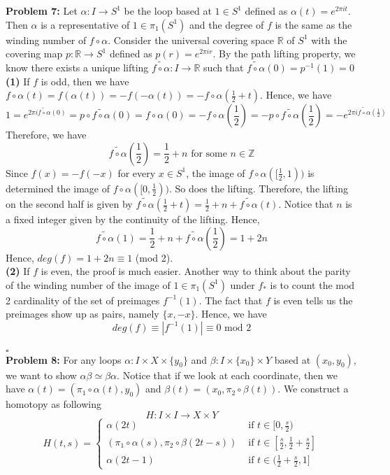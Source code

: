 \documentclass[12pt]{amsart}
\newcommand{\R}{\mathbb{R}}
\newcommand{\Z}{\mathbb{Z}}
\begin{document}
\textbf{Problem 7:} Let $\alpha: I \rightarrow S^1$ be the loop based at $1\in S^1$ defined as $\alpha(t)=e^{2\pi i t}$. Then $\alpha$ is a representative of $1\in \pi_1(S^1)$ and the degree of $f$ is the same as the winding number of $f\circ \alpha$. Consider the universal covering space $\R$ of $S^1$ with the covering map $p:\R\rightarrow S^1$ defined as $p(r)=e^{2\pi i r}$. By the path lifting property, we know there exists a unique lifting $\widetilde{f\circ \alpha}: I\rightarrow \R$ such that $\widetilde{f\circ \alpha}(0)=p^{-1}(1)=0$\\
\textbf{(1)} If $f$ is odd, then we have $f\circ \alpha(t)=f(\alpha(t))=-f(-\alpha(t))=-f\circ \alpha(\frac{1}{2}+t)$. Hence, we have
\[1=e^{2\pi i\widetilde{f\circ \alpha}(0)}=p\circ \widetilde{f\circ \alpha}(0)=f\circ \alpha(0)=-f\circ\alpha(\frac{1}{2})=-p\circ \widetilde{f\circ \alpha}(\frac{1}{2})=-e^{2\pi i\widetilde{f\circ \alpha}(\frac{1}{2})}\]
Therefore, we have
\[\widetilde{f\circ \alpha}(\frac{1}{2})=\frac{1}{2}+n \text{ for some }n\in \Z\]
Since $f(x)=-f(-x)$ for every $x\in S^1$, the image of $f\circ \alpha([\frac{1}{2},1))$ is determined the image of $f\circ \alpha([0,\frac{1}{2}))$. So does the lifting. Therefore, the lifting on the second half is given by $\widetilde{f\circ \alpha}(\frac{1}{2}+t)=\frac{1}{2}+n+\widetilde{f\circ \alpha}(t)$. Notice that $n$ is a fixed integer given by the continuity of the lifting. Hence,
\[ \widetilde{f\circ \alpha}(1)=\frac{1}{2}+n+\widetilde{f\circ \alpha}(\frac{1}{2})=1+2n\]
Hence, $deg(f)=1+2n\equiv 1$ (mod 2).
\\
\textbf{(2)} If $f$ is even, the proof is much easier. Another way to think about the parity of the winding number of the image of $1\in \pi_1(S^1)$ under $f_\ast$ is to count the mod 2 cardinality of the set of preimages $f^{-1}(1)$. The fact that $f$ is even tells us the preimages show up as pairs, namely $\{x,-x\}$. Hence, we have
\[deg(f)\equiv |f^{-1}(1)|\equiv 0 \text{ mod 2}\]
\\\phantom{qed}\hfill$\square$\\
\textbf{Problem 8:} For any loops $\alpha: I\times X\times \{y_0\}$ and $\beta: I\times \{x_0\}\times Y$ based at $(x_0,y_0)$, we want to show $\alpha\beta \simeq \beta \alpha$. Notice that if we look at each coordinate, then we have $\alpha(t)=(\pi_1 \circ \alpha(t),y_0)$ and $\beta (t)=(x_0,\pi_2\circ \beta(t))$. We construct a homotopy as following
\[H: I\times I \rightarrow X\times Y\]
\[H(t,s)=\begin{cases}
        \alpha(2t)                                   & \text{ if } t\in [0,\frac{s}{2})                       \\
        (\pi_1\circ\alpha(s),\pi_2\circ \beta(2t-s)) & \text{ if } t\in [\frac{s}{2},\frac{1}{2}+\frac{s}{2}] \\
        \alpha(2t-1)                                 & \text{ if } t\in (\frac{1}{2}+\frac{s}{2},1]
    \end{cases}
\]
\end{document}
